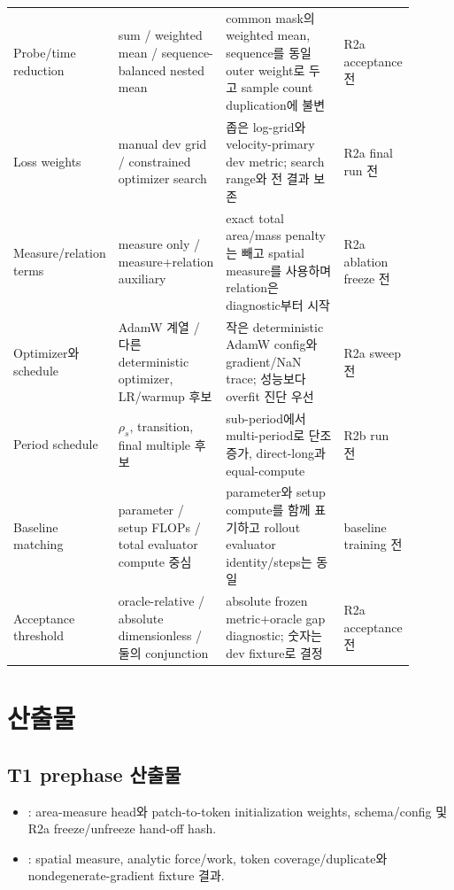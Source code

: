 \documentclass[10pt]{article}
\begin{document}
\begin{longtable}{L{0.18\linewidth}L{0.26\linewidth}L{0.30\linewidth}L{0.16\linewidth}}
Probe/time reduction & sum / weighted mean / sequence-balanced nested mean & common mask의 weighted mean, sequence를 동일 outer weight로 두고 sample count duplication에 불변 & R2a acceptance 전\\
Loss weights & manual dev grid / constrained optimizer search & 좁은 log-grid와 velocity-primary dev metric; search range와 전 결과 보존 & R2a final run 전\\
Measure/relation terms & measure only / measure+relation auxiliary & exact total area/mass penalty는 빼고 spatial measure를 사용하며 relation은 diagnostic부터 시작 & R2a ablation freeze 전\\
Optimizer와 schedule & AdamW 계열 / 다른 deterministic optimizer, LR/warmup 후보 & 작은 deterministic AdamW config와 gradient/NaN trace; 성능보다 overfit 진단 우선 & R2a sweep 전\\
Period schedule & \(\rho_s\), transition, final multiple 후보 & sub-period에서 multi-period로 단조 증가, direct-long과 equal-compute & R2b run 전\\
Baseline matching & parameter / setup FLOPs / total evaluator compute 중심 & parameter와 setup compute를 함께 표기하고 rollout evaluator identity/steps는 동일 & baseline training 전\\
Acceptance threshold & oracle-relative / absolute dimensionless / 둘의 conjunction & absolute frozen metric+oracle gap diagnostic; 숫자는 dev fixture로 결정 & R2a acceptance 전\\
\bottomrule
\end{longtable}

\section{산출물}
\label{sec:r2-chapter-6}

\subsection{T1 prephase 산출물}

\begin{itemize}
  \item {}: area-measure head와 patch-to-token initialization weights,
  schema/config 및 R2a freeze/unfreeze hand-off hash.
  \item {}: spatial measure, analytic force/work, token coverage/duplicate와
  nondegenerate-gradient fixture 결과.
\end{itemize}
\end{document}
